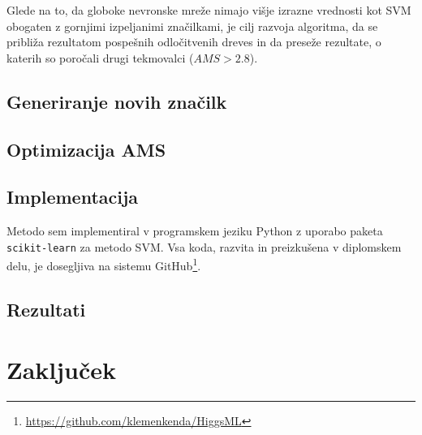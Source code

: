 \documentclass[11pt,a4paper,openany]{book}
\begin{document}
Glede na to, da globoke nevronske mreže nimajo višje izrazne vrednosti kot SVM obogaten z gornjimi izpeljanimi značilkami, je cilj razvoja algoritma, da se približa rezultatom pospešnih odločitvenih dreves in da preseže rezultate, o katerih so poročali drugi tekmovalci ($AMS > 2.8$).


\section{Generiranje novih značilk}
 \cite{Adam-Bourdarios14}

\section{Optimizacija AMS}

\section{Implementacija}
Metodo sem implementiral v programskem jeziku Python z uporabo paketa \texttt{scikit-learn}\cite{scikit-learn} za metodo SVM. Vsa koda, razvita in preizkušena v diplomskem delu, je dosegljiva na sistemu GitHub\footnote{\url{https://github.com/klemenkenda/HiggsML}}.


\section{Rezultati}




\chapter*{Zaključek}




\end{document}
